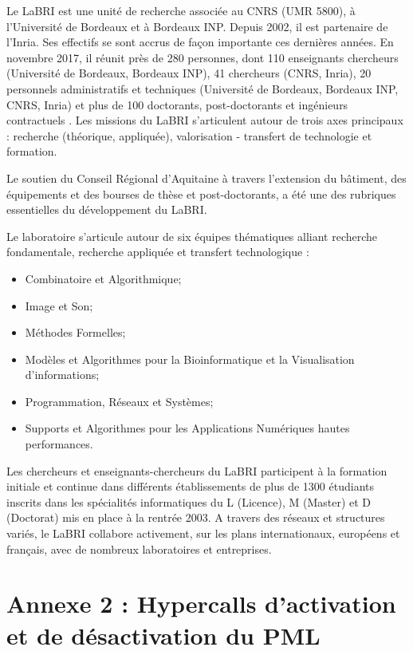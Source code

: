 \noindent Le LaBRI est une unité de recherche associée au CNRS (UMR 5800), à l'Université de Bordeaux et à Bordeaux INP. Depuis 2002, il est partenaire de l'Inria. Ses effectifs se sont accrus de façon importante ces dernières années. En novembre 2017, il réunit près de 280 personnes, dont 110 enseignants chercheurs (Université de Bordeaux, Bordeaux INP), 41 chercheurs (CNRS, Inria), 20 personnels administratifs et techniques (Université de Bordeaux, Bordeaux INP, CNRS, Inria) et plus de 100 doctorants, post-doctorants et ingénieurs contractuels . Les missions du LaBRI s'articulent autour de trois axes principaux : recherche (théorique, appliquée), valorisation - transfert de technologie et formation.

\noindent Le soutien du Conseil Régional d'Aquitaine à travers l'extension du bâtiment, des équipements et des bourses de thèse et post-doctorants, a été une des rubriques essentielles du développement du LaBRI.

\noindent Le laboratoire s'articule autour de six équipes thématiques alliant recherche fondamentale, recherche appliquée et transfert technologique : 
\begin{itemize}[label=]
    \item Combinatoire et Algorithmique;
    \item Image et Son;
    \item Méthodes Formelles;
    \item Modèles et Algorithmes pour la Bioinformatique et la Visualisation d'informations;
    \item Programmation, Réseaux et Systèmes;
    \item Supports et Algorithmes pour les Applications Numériques hautes performances.
\end{itemize}

\noindent Les chercheurs et enseignants-chercheurs du LaBRI participent à la formation initiale et continue dans différents établissements de plus de 1300 étudiants inscrits dans les spécialités informatiques du L (Licence), M (Master) et D (Doctorat) mis en place à la rentrée 2003. A travers des réseaux et structures variés, le LaBRI collabore activement, sur les plans internationaux, européens et français, avec de nombreux laboratoires et entreprises. 

\section*{Annexe 2 : Hypercalls d'activation et de désactivation du PML}
\label{section:enable_disable_logdirty}

